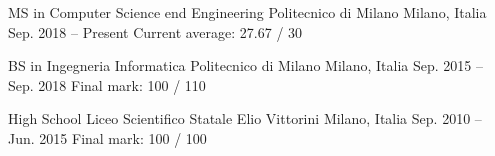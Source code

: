 

\begin{cventries}

\cventry
    {MS in Computer Science end Engineering}
    {Politecnico di Milano}
    {Milano, Italia}
    {Sep. 2018 -- Present}
    {Current average: 27.67 / 30}
    
\cventry
    {BS in Ingegneria Informatica}
    {Politecnico di Milano}
    {Milano, Italia}
    {Sep. 2015 -- Sep. 2018}
    {Final mark: 100 / 110}
    
\cventry
    {High School}
    {Liceo Scientifico Statale Elio Vittorini}
    {Milano, Italia}
    {Sep. 2010 -- Jun. 2015}
    {Final mark: 100 / 100}
\end{cventries}
